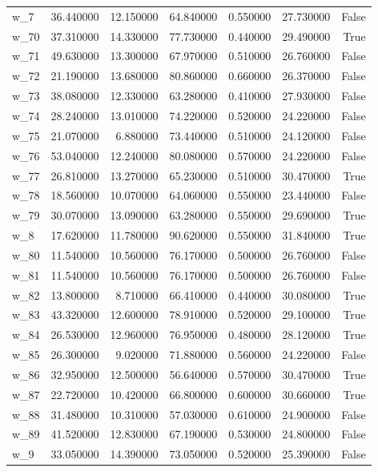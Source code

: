 \begin{table}
\begin{tabular}{lrrrrrr}
w\_7 & 36.440000 & 12.150000 & 64.840000 & 0.550000 & 27.730000 & False \\
w\_70 & 37.310000 & 14.330000 & 77.730000 & 0.440000 & 29.490000 & True \\
w\_71 & 49.630000 & 13.300000 & 67.970000 & 0.510000 & 26.760000 & False \\
w\_72 & 21.190000 & 13.680000 & 80.860000 & 0.660000 & 26.370000 & False \\
w\_73 & 38.080000 & 12.330000 & 63.280000 & 0.410000 & 27.930000 & False \\
w\_74 & 28.240000 & 13.010000 & 74.220000 & 0.520000 & 24.220000 & False \\
w\_75 & 21.070000 & 6.880000 & 73.440000 & 0.510000 & 24.120000 & False \\
w\_76 & 53.040000 & 12.240000 & 80.080000 & 0.570000 & 24.220000 & False \\
w\_77 & 26.810000 & 13.270000 & 65.230000 & 0.510000 & 30.470000 & True \\
w\_78 & 18.560000 & 10.070000 & 64.060000 & 0.550000 & 23.440000 & False \\
w\_79 & 30.070000 & 13.090000 & 63.280000 & 0.550000 & 29.690000 & True \\
w\_8 & 17.620000 & 11.780000 & 90.620000 & 0.550000 & 31.840000 & True \\
w\_80 & 11.540000 & 10.560000 & 76.170000 & 0.500000 & 26.760000 & False \\
w\_81 & 11.540000 & 10.560000 & 76.170000 & 0.500000 & 26.760000 & False \\
w\_82 & 13.800000 & 8.710000 & 66.410000 & 0.440000 & 30.080000 & True \\
w\_83 & 43.320000 & 12.600000 & 78.910000 & 0.520000 & 29.100000 & True \\
w\_84 & 26.530000 & 12.960000 & 76.950000 & 0.480000 & 28.120000 & True \\
w\_85 & 26.300000 & 9.020000 & 71.880000 & 0.560000 & 24.220000 & False \\
w\_86 & 32.950000 & 12.500000 & 56.640000 & 0.570000 & 30.470000 & True \\
w\_87 & 22.720000 & 10.420000 & 66.800000 & 0.600000 & 30.660000 & True \\
w\_88 & 31.480000 & 10.310000 & 57.030000 & 0.610000 & 24.900000 & False \\
w\_89 & 41.520000 & 12.830000 & 67.190000 & 0.530000 & 24.800000 & False \\
w\_9 & 33.050000 & 14.390000 & 73.050000 & 0.520000 & 25.390000 & False \\

\end{tabular}
\end{table}
